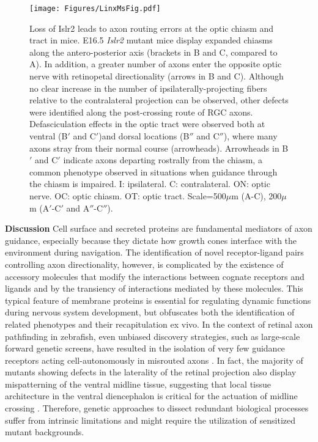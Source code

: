 \begin{figure}[hbtp]
    \begin{center}
        \texttt{[image: Figures/LinxMsFig.pdf]}
        \caption[Loss of Islr2 leads to axon routing errors at the optic chiasm and tract in mice.]
        {Loss of Islr2 leads to axon routing errors at the optic chiasm and tract in mice.
		E16.5 \emph{Islr2} mutant mice display expanded chiasms along the antero-posterior axis (brackets in B and C, compared to A).
		In addition, a greater number of axons enter the opposite optic nerve with retinopetal directionality (arrows in B and C).
		Although no clear increase in the number of ipsilaterally-projecting fibers relative to the contralateral projection can be observed, other defects were identified along the post-crossing route of RGC axons.
		Defasciculation effects in the optic tract were observed both at ventral (B$'$ and C$'$)and dorsal locations (B$''$ and C$''$), where many axons stray from their normal course (arrowheads).
		Arrowheads in B$'$ and C$'$ indicate axons departing rostrally from the chiasm, a common phenotype observed in situations when guidance through the chiasm is impaired. 
		I: ipsilateral.
		C: contralateral.
		ON: optic nerve.
		OC: optic chiasm.
		OT: optic tract.
		Scale=500$\mu$m (A-C), 200$\mu$m (A$'$-C$'$ and A$''$-C$''$).
		}
        \label{LinxMsFig}
    \end{center}
\end{figure}

\textbf{Discussion}\newline
Cell surface and secreted proteins are fundamental mediators of axon guidance, especially because they dictate how growth cones interface with the environment during navigation.
The identification of novel receptor-ligand pairs controlling axon directionality, however, is complicated by the existence of accessory molecules that modify the interactions between cognate receptors and ligands and by the transiency of interactions mediated
by these molecules.
This typical feature of membrane proteins is essential for regulating dynamic functions during nervous system development, but obfuscates both the identification of related phenotypes and their recapitulation ex vivo.
In the context of retinal axon pathfinding in zebrafish, even unbiased discovery strategies, such as large-scale forward genetic screens, have resulted in the isolation of very few guidance receptors acting cell-autonomously in misrouted axons \cite{karlstrom1996zebrafish,trowe1996mutations}.
In fact, the majority of mutants showing defects in the laterality of the retinal projection also display mispatterning of the ventral midline tissue, suggesting that local tissue architecture in the ventral diencephalon is critical for the actuation of midline crossing \cite{barresi2005hedgehog,seth2006belladonna,bergeron2011brother}.
Therefore, genetic approaches to dissect redundant biological processes suffer from intrinsic limitations and might require the utilization of sensitized mutant backgrounds.

